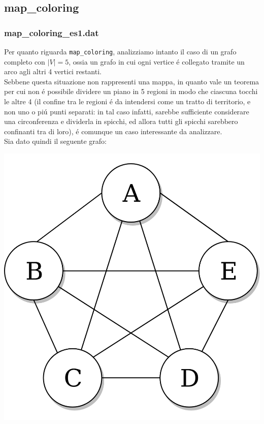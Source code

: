 \documentclass{article}
\begin{document}
\subsection{map\_coloring}
\subsubsection{map\_coloring\_es1.dat}

Per quanto riguarda \texttt{map\_coloring}, analizziamo intanto il caso di un grafo completo con $|V| = 5$, ossia un grafo in cui ogni vertice \'e collegato tramite un arco agli altri 4 vertici restanti. \\
Sebbene questa situazione non rappresenti una mappa, in quanto vale un teorema per cui non \'e possibile dividere un piano in 5 regioni in modo che ciascuna tocchi le altre 4 (il confine tra le regioni \'e da intendersi come un tratto di territorio, e non uno o pi\'u punti separati: in tal caso infatti, sarebbe sufficiente considerare una circonferenza e dividerla in spicchi, ed allora tutti gli spicchi sarebbero confinanti tra di loro), \'e comunque un caso interessante da analizzare.\\
Sia dato quindi il seguente grafo:\\

\begin{center}
\includegraphics[scale=0.2]{complete_graph.png}
\end{center}
\end{document}
